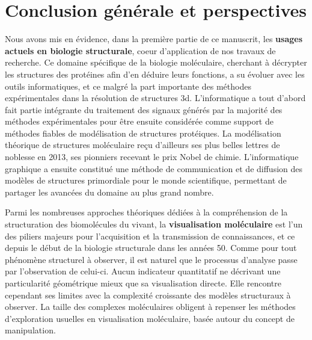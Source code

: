 


\chapter*{Conclusion générale et perspectives}
\mtcaddchapter

\mtcaddpart



Nous avons mis en évidence, dans la première partie de ce manuscrit, les \textbf{usages actuels en biologie structurale}, coeur d'application de nos travaux de recherche. Ce domaine spécifique de la biologie moléculaire, cherchant à décrypter les structures des protéines afin d'en déduire leurs fonctions, a su évoluer avec les outils informatiques, et ce malgré la part importante des méthodes expérimentales dans la résolution de structures 3d. 
L'informatique a tout d'abord fait partie intégrante du traitement des signaux générés par la majorité des méthodes expérimentales pour être ensuite considérée comme support de méthodes fiables de modélisation de structures protéiques. La modélisation théorique de structures moléculaire reçu d'ailleurs ses plus belles lettres de noblesse en 2013, ses pionniers recevant le prix Nobel de chimie. L'informatique graphique a ensuite constitué une méthode de communication et de diffusion des modèles de structures primordiale pour le monde scientifique, permettant de partager les avancées du domaine au plus grand nombre.

Parmi les nombreuses approches théoriques dédiées à la compréhension de la structuration des biomolécules du vivant, la \textbf{visualisation moléculaire} est l'un des piliers majeurs pour l'acquisition et la transmission de connaissances, et ce depuis le début de la biologie structurale dans les années 50. Comme pour tout phénomène structurel à observer, il est naturel que le processus d'analyse passe par l'observation de celui-ci. Aucun indicateur quantitatif ne décrivant une particularité géométrique mieux que sa visualisation directe. Elle rencontre cependant ses limites avec la complexité croissante des modèles structuraux à observer. La taille des complexes moléculaires obligent à repenser les méthodes d'exploration usuelles en visualisation moléculaire, basée autour du concept de manipulation.


